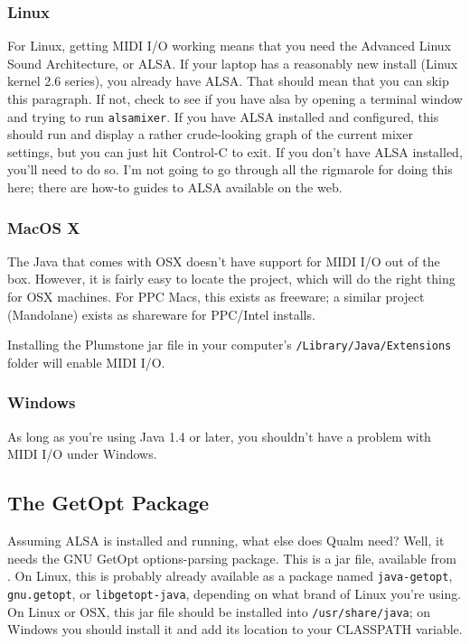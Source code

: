 \documentclass{article}
\newcommand{\q}{{\textsf{Qualm}}\xspace}
\newcommand{\code}[1]{{\tt #1}}
\begin{document}
\subsubsection{Linux}

For Linux, getting MIDI I/O working means that you need the Advanced
Linux Sound Architecture, or ALSA.  If your laptop has a reasonably
new install (Linux kernel 2.6 series), you already have ALSA.  That
should mean that you can skip this paragraph.  If not, check to see if
you have alsa by opening a terminal window and trying to run
\code{alsamixer}.  If you have ALSA installed and configured, this
should run and display a rather crude-looking graph of the current
mixer settings, but you can just hit Control-C to exit.  If you don't
have ALSA installed, you'll need to do so.  I'm not going to go
through all the rigmarole for doing this here; there are how-to guides
to ALSA available on the web.

\subsubsection{MacOS X}

The Java that comes with OSX doesn't have support for MIDI I/O out of
the box.  However, it is fairly easy to locate the
 project, which will
do the right thing for OSX machines.  For PPC Macs, this exists as
freeware; a similar project (Mandolane) exists as shareware for
PPC/Intel installs.

Installing the Plumstone jar file in your computer's
\code{/Li\-bra\-ry/Ja\-va/Ex\-ten\-sions} folder will enable MIDI I/O.

\subsubsection{Windows}

As long as you're using Java 1.4 or later, you shouldn't have a
problem with MIDI I/O under Windows.

\subsection{The GetOpt Package}

Assuming ALSA is installed and running, what else does \q need?  Well,
it needs the GNU GetOpt options-parsing package.  This is a jar file,
available from .  On
Linux, this is probably already available as a package named
\code{java-getopt}, \code{gnu.getopt}, or \code{libgetopt-java},
depending on what brand of Linux you're using.  On Linux or OSX, this
jar file should be installed into \code{/usr/share/java}; on Windows
you should install it and add its location to your CLASSPATH variable.
\end{document}
